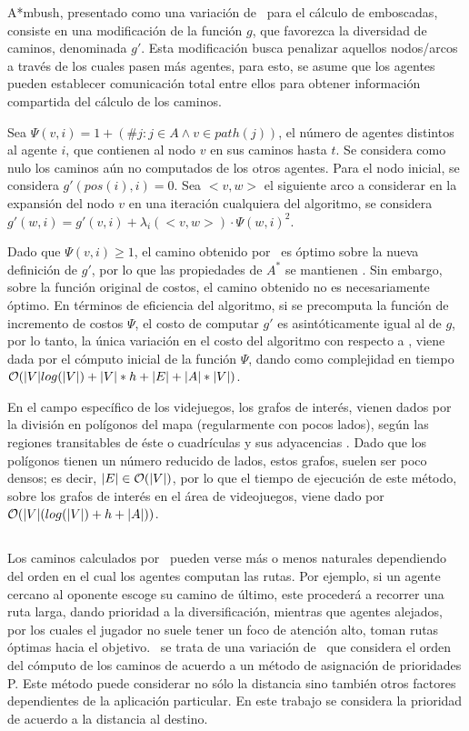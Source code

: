 A*mbush, presentado como una variaci\'on de \astar\ para el c\'alculo
de emboscadas\cite{FGC12e}, consiste en una modificación de la
función $g$, que favorezca la diversidad de caminos, denominada $g'$.
Esta modificaci\'on busca penalizar aquellos nodos/arcos a trav\'es
de los cuales pasen m\'as agentes, para esto, se asume que los
agentes pueden establecer comunicaci\'on total entre ellos para
obtener informaci\'on compartida del c\'alculo de los caminos.

Sea $\Psi(v,i) = 1+(\# j : j \in A \wedge v \in path(j))$,
el número de agentes distintos al agente $i$, que contienen al
nodo $v$ en sus caminos hasta $t$. Se considera como nulo los
caminos a\'un no computados de los otros agentes.
Para el nodo inicial, se considera $g'(pos(i),i) = 0$.
Sea $<v,w>$ el siguiente arco a considerar en la expansión del
nodo $v$ en una iteración cualquiera del algoritmo, se considera
$g'(w, i) = g'(v,i) + \lambda_i(<v,w>) \cdot \Psi(w,i)^2$.

Dado que $\Psi(v,i) \geq 1$, el camino obtenido por \ambush\
es óptimo sobre la nueva definición de $g'$, por lo que las
propiedades de $A^*$ se mantienen \cite{HNR72}. Sin embargo, sobre
la función original de costos, el camino obtenido no es necesariamente
óptimo. En t\'erminos de eficiencia del algoritmo, si se precomputa
la funci\'on de incremento de costos $\Psi$, el costo de computar
$g'$ es asintóticamente igual al de $g$, por lo tanto, la única variación
en el costo del algoritmo con respecto a \astar, viene dada por el cómputo
inicial de la función $\Psi$, dando como complejidad en tiempo
$\mathcal{O}(|V|log(|V|) + |V|*h + |E| + |A|*|V| )$.

En el campo específico de los videjuegos, los grafos
de interés, vienen dados por la división en polígonos
del mapa
\cite{MF09} \cite{CS11}
(regularmente con pocos lados), según las
regiones transitables de éste o cuadrículas y sus
adyacencias \cite{MF09} \cite{CS11}.
Dado que los polígonos tienen un número
reducido de lados, estos grafos, suelen ser poco densos;
es decir, $|E| \in \mathcal{O}(|V|)$, por lo que el tiempo
de ejecución de este método, sobre los grafos de interés
en el área de videojuegos, viene dado por
$\mathcal{O}(|V|(log(|V|) + h + |A|) )$.

\subsection{\pambush}

Los caminos calculados por \ambush\ pueden verse m\'as o menos
naturales dependiendo del orden en el cual los agentes computan
las rutas. Por ejemplo, si un agente cercano al oponente escoge
su camino de \'ultimo, este proceder\'a a recorrer una ruta
larga, dando prioridad a la diversificaci\'on, mientras que
agentes alejados, por los cuales el jugador no suele tener un
foco de atenci\'on alto, toman rutas \'optimas hacia el objetivo.
\pambush\ se trata de una variaci\'on de \ambush\ que considera el
orden del c\'omputo de los caminos de acuerdo a un m\'etodo de
asignaci\'on de prioridades P. Este m\'etodo puede considerar
no s\'olo la distancia sino tambi\'en otros factores dependientes
de la aplicaci\'on particular. En este trabajo se considera la
prioridad de acuerdo a la distancia al destino.

